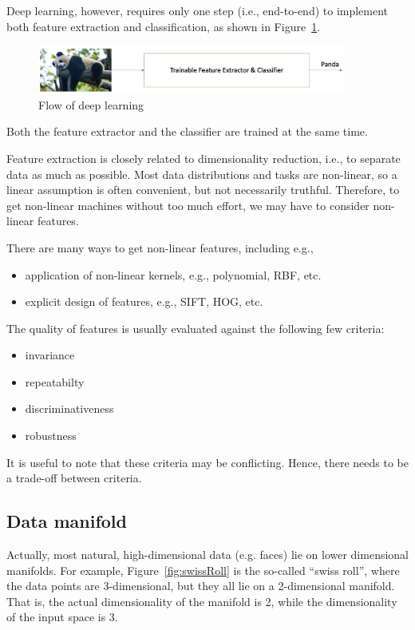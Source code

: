 Deep learning, however, requires only one step (i.e., end-to-end) to implement both feature extraction and classification, as shown in Figure~\ref{fig:deeplearningflow}. 
\begin{figure}[!htbp]
    \centering
    \includegraphics[width=0.9\textwidth]{images/deepLearning/functionalView/deeplearningflow.png}
    \caption{Flow of deep learning}
    \label{fig:deeplearningflow}
\end{figure}
Both the feature extractor and the classifier are trained at the same time. 

Feature extraction is closely related to dimensionality reduction, i.e., to separate data as much as possible. Most data distributions and tasks are non-linear, so a linear assumption is often convenient, but not necessarily truthful. Therefore, to get non-linear machines without too much effort, we may have to consider non-linear features. 

There are many ways to get non-linear features, including e.g., 
\begin{itemize}
    \item application of non-linear kernels, e.g., polynomial, RBF, etc.
    \item explicit design of features, e.g., SIFT, HOG, etc. 
\end{itemize}

The quality of features is usually evaluated against  the following few criteria: 
\begin{itemize}
    \item invariance
    \item repeatabilty 
    \item discriminativeness  
    \item robustness 
\end{itemize}
It is useful to note that these criteria may be conflicting. Hence, there needs to be a trade-off between criteria. 

\subsection*{Data manifold}

Actually, most natural, high-dimensional data (e.g. faces) lie on lower dimensional manifolds. For example, Figure~\ref{fig:swissRoll} is the so-called ``swiss roll'', where the data points are 3-dimensional, but they all lie on a 2-dimensional manifold. That is, the actual dimensionality of the manifold is 2, while the dimensionality of the input space is 3. 


